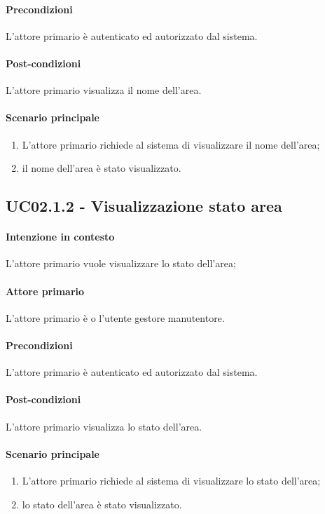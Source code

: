 \paragraph{Precondizioni}  L'attore primario è autenticato ed autorizzato dal sistema.
\paragraph{Post-condizioni} L'attore primario visualizza il nome dell'area.
\paragraph{Scenario principale}
\begin{enumerate}
    \item L'attore primario richiede al sistema di visualizzare il nome dell'area;
    \item il nome dell'area è stato visualizzato.
\end{enumerate}

\subsection{UC02.1.2 - Visualizzazione stato area}\label{uc:02.1.2}

\paragraph{Intenzione in contesto} L'attore primario vuole visualizzare lo stato dell'area;
\paragraph{Attore primario} L'attore primario è o l'utente gestore manutentore.
\paragraph{Precondizioni}  L'attore primario è autenticato ed autorizzato dal sistema.
\paragraph{Post-condizioni} L'attore primario visualizza lo stato dell'area.
\paragraph{Scenario principale}
\begin{enumerate}
    \item L'attore primario richiede al sistema di visualizzare lo stato dell'area;
    \item lo stato dell'area è stato visualizzato.
\end{enumerate}